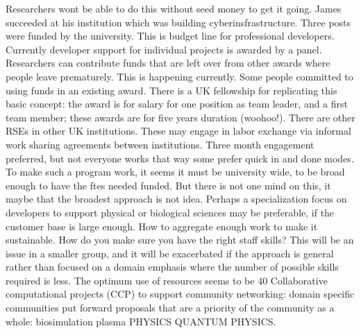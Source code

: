 Researchers wont be able to do this without seed money to get it going. James succeeded at his institution which was building cyberinsfrastructure. Three posts were funded by the university. This is budget line for professional developers. Currently developer support for individual projects is awarded by a panel. Researchers can contribute funds that are left over from other awards where people leave prematurely. This is happening currently.  Some people committed to using funds in an existing award. There is a UK fellowship for replicating this basic concept: the award is for salary for one position as team leader,  and a first team member; these awards are for five years duration (woohoo!). There are other RSEs in other UK institutions. These may engage in labor exchange via  informal work sharing agreements between institutions. Three month engagement preferred, but not everyone works that way some prefer quick in and done modes.
To make such a program work, it seems it  must be university wide, to be broad enough to have the ftes needed funded. But there is not one mind on this, it maybe that the broadest approach is not idea. Perhaps a specialization focus on developers to support physical or biological sciences may be preferable, if the customer base is large enough. How to aggregate enough work to make it sustainable. How do you make sure you have the right staff skills? This will be an issue in a smaller group, and it will be exacerbated if the approach is general rather than focused on a domain emphasis where the number of possible skills required is less. The optimum use of resources seems to be 40%
Collaborative computational projects (CCP) to support community networking: domain specific communities put forward proposals that are a priority of the community as a whole: biosimulation plasma PHYSICS QUANTUM PHYSICS. %
